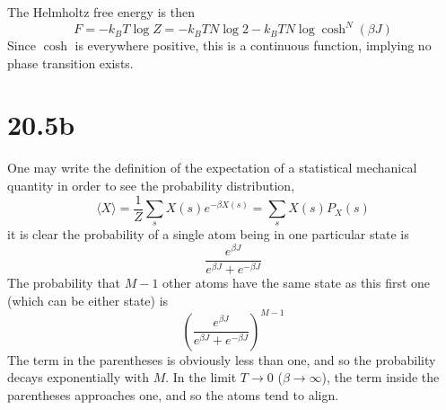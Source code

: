 \documentclass{article}
\begin{document}
The Helmholtz free energy is then
\[
  F=-k_{B}T\log Z=-k_{B}TN\log 2-k_{B}TN\log\cosh^{N}(\beta J)
\]
Since $\cosh$ is everywhere positive, this is a continuous function, implying no phase transition exists.

\section*{20.5b}
One may write the definition of the expectation of a statistical mechanical quantity in order to see the probability distribution,
\[
  \langle X\rangle = \frac{1}{Z}\sum_{s}X(s)e^{-\beta X(s)}=\sum_{s}X(s)P_{X}(s)
\]
it is clear the probability of a single atom being in one particular state is
\[
  \frac{e^{\beta J}}{e^{\beta J}+e^{-\beta J}}
\]
The probability that $M-1$ other atoms have the same state as this first one (which can be either state) is
\[
  \left(    \frac{e^{\beta J}}{e^{\beta J}+e^{-\beta J}}\right)^{M-1}
\]
The term in the parentheses is obviously less than one, and so the probability decays exponentially with $M$.
In the limit $T\to 0$ ($\beta\to \infty$), the term inside the parentheses approaches one, and so the atoms tend to align.
\end{document}
